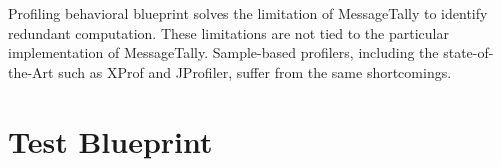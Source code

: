 \documentclass[runningheads]{llncs}
\newcommand{\fig}[4]{
	\begin{figure}[#1]
		\centering
		\texttt{[image: \#3]}
		\caption{\label{fig:#3}#4}
	\end{figure}}
\newcommand{\seclabel}[1]{\label{sec:#1}}
\newcommand{\figref}[1]{Figure~\ref{fig:#1}}
\newcommand{\tablabel}[1]{\label{tab:#1}}
\begin{document}
Profiling behavioral blueprint solves the limitation of MessageTally to identify redundant computation. These limitations are not tied to the particular implementation of MessageTally. Sample-based profilers, including the state-of-the-Art such as XProf and JProfiler, suffer from the same shortcomings. 


%
%





\section{Test Blueprint} \seclabel{testblueprint}
\end{document}
